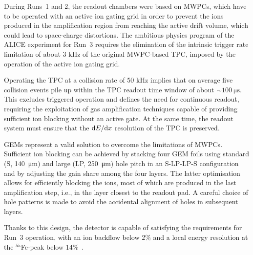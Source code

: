 During Runs~1 and 2, the readout chambers were based on MWPCs, which have to be operated with an active ion gating grid in order to prevent the ions produced in the amplification region from reaching the active drift volume, which could lead to space-charge distortions. The ambitious physics program of the ALICE experiment for Run~3 requires the elimination of the intrinsic trigger rate limitation of about 3 kHz of the original MWPC-based TPC, imposed by the operation of the active ion gating grid.

Operating the TPC at a collision rate of 50 kHz implies that on average five collision events pile up within the TPC readout time window of about $\sim\SI{100}{\micro\second}$. This excludes triggered operation and defines the need for continuous readout, requiring the exploitation of gas amplification techniques capable of providing sufficient ion blocking without an active gate. At the same time, the readout system must ensure that the $\mathrm{d} E/\mathrm{d} x$ resolution of the TPC is preserved.

GEMs represent a valid solution to overcome the limitations of MWPCs. Sufficient ion blocking can be achieved by stacking four GEM foils using standard (S, \SI{140}{\micro\meter}) and large (LP, \SI{250}{\micro\meter}) hole pitch in an S-LP-LP-S configuration and by adjusting the gain share among the four layers. The latter optimisation allows for efficiently blocking the ions, most of which are produced in the last amplification step, i.e., in the layer closest to the readout pad. A careful choice of hole patterns is made to avoid the accidental alignment of holes in subsequent layers. 

Thanks to this design, the detector is capable of satisfying the requirements for Run~3 operation, with an ion backflow below 2\% and a local energy resolution at the $^{55}$Fe-peak below 14\%~\cite{ALICETPC:2020ann}.

